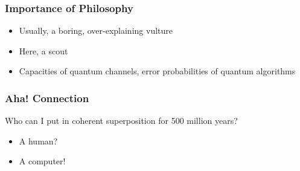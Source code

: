 \documentclass{beamer}
\begin{document}
\begin{frame}
\frametitle{Importance of Philosophy}
\begin{itemize}
    \item Usually, a boring, over-explaining vulture
    \item Here, a \alert{scout}
    \item Capacities of quantum channels, error probabilities of quantum algorithms
\end{itemize}
\end{frame}

\begin{frame}
\frametitle{Aha! Connection}
Who can I put in coherent superposition for 500 million years?
\begin{itemize}
    \item<1-> A human? 
    \item<2-> A computer!
\end{itemize}
\end{frame}
\end{document}
